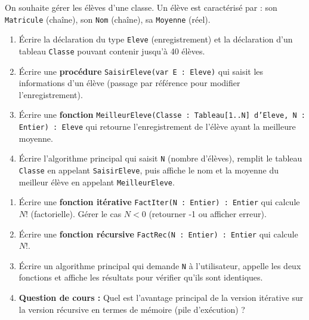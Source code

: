 \documentclass[11pt]{article}
\begin{document}
\begin{exercice}
On souhaite gérer les élèves d'une classe. Un élève est caractérisé par : son \texttt{Matricule} (chaîne), son \texttt{Nom} (chaîne), sa \texttt{Moyenne} (réel).
\begin{enumerate}
    \item Écrire la déclaration du type \texttt{Eleve} (enregistrement) et la déclaration d'un tableau \texttt{Classe} pouvant contenir jusqu'à 40 élèves.
    \item Écrire une \textbf{procédure} \texttt{SaisirEleve(var E : Eleve)} qui saisit les informations d'un élève (passage par référence pour modifier l'enregistrement).
    \item Écrire une \textbf{fonction} \texttt{MeilleurEleve(Classe : Tableau[1..N] d'Eleve, N : Entier) : Eleve} qui retourne l'enregistrement de l'élève ayant la meilleure moyenne.
    \item Écrire l'algorithme principal qui saisit \texttt{N} (nombre d'élèves), remplit le tableau \texttt{Classe} en appelant \texttt{SaisirEleve}, puis affiche le nom et la moyenne du meilleur élève en appelant \texttt{MeilleurEleve}.
\end{enumerate}
\end{exercice}

\begin{exercice}
\begin{enumerate}
    \item Écrire une \textbf{fonction itérative} \texttt{FactIter(N : Entier) : Entier} qui calcule $N!$ (factorielle). Gérer le cas $N < 0$ (retourner -1 ou afficher erreur).
    \item Écrire une \textbf{fonction récursive} \texttt{FactRec(N : Entier) : Entier} qui calcule $N!$.
    \item Écrire un algorithme principal qui demande \texttt{N} à l'utilisateur, appelle les deux fonctions et affiche les résultats pour vérifier qu'ils sont identiques.
    \item \textbf{Question de cours :} Quel est l'avantage principal de la version itérative sur la version récursive en termes de mémoire (pile d'exécution) ?
\end{enumerate}
\end{exercice}
\end{document}
